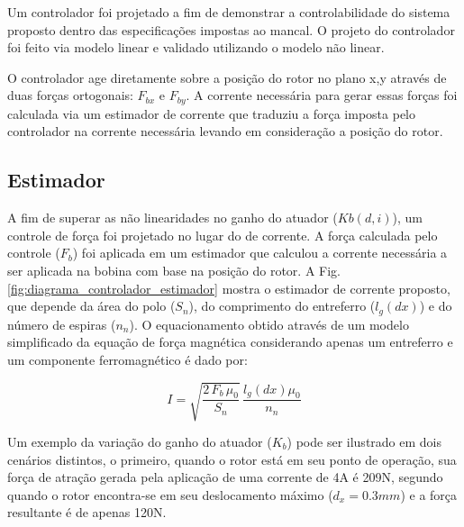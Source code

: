Um controlador foi projetado a fim de demonstrar a controlabilidade do sistema proposto dentro das especificações impostas ao mancal. O projeto do controlador foi feito via modelo linear e validado utilizando o modelo não linear. 

O controlador age diretamente sobre a posição do rotor no plano x,y através de duas forças ortogonais: $F_{bx}$ e $F_{by}$. A corrente necessária para gerar essas forças foi calculada via um estimador de corrente que traduziu a força imposta pelo controlador na corrente necessária levando em consideração a posição do rotor.


\subsection{Estimador}
	
A fim de superar as não linearidades no ganho do atuador ($Kb(d,i)$), um controle de força foi projetado no lugar do de corrente. A força calculada pelo controle ($F_b$) foi aplicada em um estimador que calculou a corrente necessária a ser aplicada na bobina com base na posição do rotor. A Fig. \ref{fig:diagrama_controlador_estimador} mostra o estimador de corrente proposto, que depende da área do polo ($S_n$), do comprimento do entreferro ($l_g(dx)$) e do número de espiras ($n_n$). O equacionamento obtido através de um modelo simplificado da equação de força magnética considerando apenas um entreferro e um componente ferromagnético é dado por:

	
\begin{equation}
I = \sqrt{\frac{2 \, F_b \, \mu_0}{S_n}} \, \frac{l_g(dx) \mu_0}{n_n}
\label{eq:estimator:i}
\end{equation}
	
Um exemplo da variação do ganho do atuador ($K_b$) pode ser ilustrado em dois cenários distintos, o primeiro, quando o rotor está em seu ponto de operação, sua força de atração gerada pela aplicação de uma corrente de 4A é 209N, segundo quando o rotor encontra-se em seu deslocamento máximo ($d_x = 0.3 mm$) e a força resultante é de apenas 120N.


